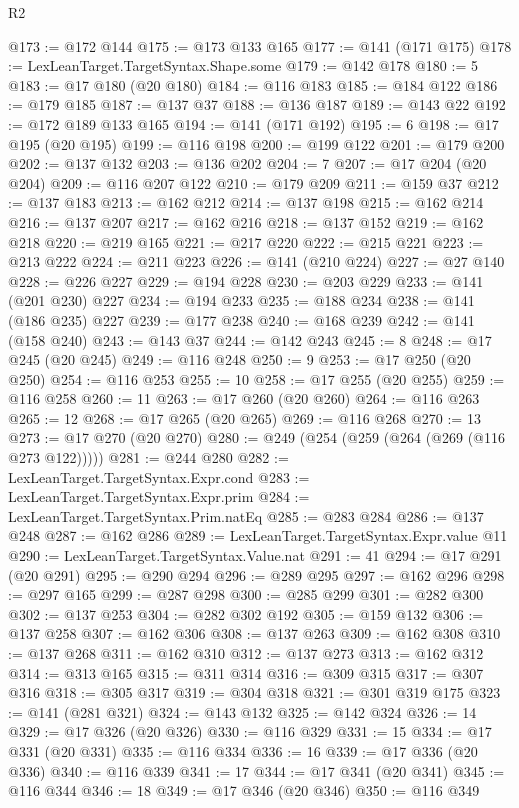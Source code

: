 \begin{lexlean}{R2}
\begin{coremodule}
@173 := @172 @144
@175 := @173 @133 @165
@177 := @141 (@171 @175)
@178 := LexLeanTarget.TargetSyntax.Shape.some
@179 := @142 @178
@180 := 5
@183 := @17 @180 (@20 @180)
@184 := @116 @183
@185 := @184 @122
@186 := @179 @185
@187 := @137 @37
@188 := @136 @187
@189 := @143 @22
@192 := @172 @189 @133 @165
@194 := @141 (@171 @192)
@195 := 6
@198 := @17 @195 (@20 @195)
@199 := @116 @198
@200 := @199 @122
@201 := @179 @200
@202 := @137 @132
@203 := @136 @202
@204 := 7
@207 := @17 @204 (@20 @204)
@209 := @116 @207 @122
@210 := @179 @209
@211 := @159 @37
@212 := @137 @183
@213 := @162 @212
@214 := @137 @198
@215 := @162 @214
@216 := @137 @207
@217 := @162 @216
@218 := @137 @152
@219 := @162 @218
@220 := @219 @165
@221 := @217 @220
@222 := @215 @221
@223 := @213 @222
@224 := @211 @223
@226 := @141 (@210 @224)
@227 := @27 @140
@228 := @226 @227
@229 := @194 @228
@230 := @203 @229
@233 := @141 (@201 @230) @227
@234 := @194 @233
@235 := @188 @234
@238 := @141 (@186 @235) @227
@239 := @177 @238
@240 := @168 @239
@242 := @141 (@158 @240)
@243 := @143 @37
@244 := @142 @243
@245 := 8
@248 := @17 @245 (@20 @245)
@249 := @116 @248
@250 := 9
@253 := @17 @250 (@20 @250)
@254 := @116 @253
@255 := 10
@258 := @17 @255 (@20 @255)
@259 := @116 @258
@260 := 11
@263 := @17 @260 (@20 @260)
@264 := @116 @263
@265 := 12
@268 := @17 @265 (@20 @265)
@269 := @116 @268
@270 := 13
@273 := @17 @270 (@20 @270)
@280 := @249 (@254 (@259 (@264 (@269 (@116 @273 @122)))))
@281 := @244 @280
@282 := LexLeanTarget.TargetSyntax.Expr.cond
@283 := LexLeanTarget.TargetSyntax.Expr.prim
@284 := LexLeanTarget.TargetSyntax.Prim.natEq
@285 := @283 @284
@286 := @137 @248
@287 := @162 @286
@289 := LexLeanTarget.TargetSyntax.Expr.value @11
@290 := LexLeanTarget.TargetSyntax.Value.nat
@291 := 41
@294 := @17 @291 (@20 @291)
@295 := @290 @294
@296 := @289 @295
@297 := @162 @296
@298 := @297 @165
@299 := @287 @298
@300 := @285 @299
@301 := @282 @300
@302 := @137 @253
@304 := @282 @302 @192
@305 := @159 @132
@306 := @137 @258
@307 := @162 @306
@308 := @137 @263
@309 := @162 @308
@310 := @137 @268
@311 := @162 @310
@312 := @137 @273
@313 := @162 @312
@314 := @313 @165
@315 := @311 @314
@316 := @309 @315
@317 := @307 @316
@318 := @305 @317
@319 := @304 @318
@321 := @301 @319 @175
@323 := @141 (@281 @321)
@324 := @143 @132
@325 := @142 @324
@326 := 14
@329 := @17 @326 (@20 @326)
@330 := @116 @329
@331 := 15
@334 := @17 @331 (@20 @331)
@335 := @116 @334
@336 := 16
@339 := @17 @336 (@20 @336)
@340 := @116 @339
@341 := 17
@344 := @17 @341 (@20 @341)
@345 := @116 @344
@346 := 18
@349 := @17 @346 (@20 @346)
@350 := @116 @349

\end{coremodule}
\end{lexlean}
